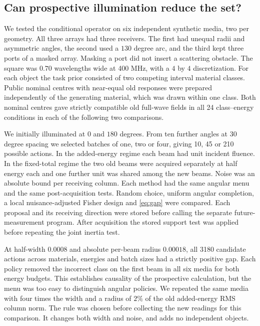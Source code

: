 \subsection{Can prospective illumination reduce the set?}
We tested the conditional operator on six independent synthetic media, two per geometry. All three arrays had three receivers. The first had unequal radii and asymmetric angles, the second used a $130$ degree arc, and the third kept three ports of a masked array. Masking a port did not insert a scattering obstacle. The square was $0.70$ wavelengths wide at 400 MHz, with a $4$ by $4$ discretization. For each object the task prior consisted of two competing interval material classes. Public nominal centres with near-equal old responses were prepared independently of the generating material, which was drawn within one class. Both nominal centres gave strictly compatible old full-wave fields in all 24 class--energy conditions in each of the following two comparisons.

We initially illuminated at $0$ and $180$ degrees. From ten further angles at $30$ degree spacing we selected batches of one, two or four, giving 10, 45 or 210 possible actions. In the added-energy regime each beam had unit incident fluence. In the fixed-total regime the two old beams were acquired separately at half energy each and one further unit was shared among the new beams. Noise was an absolute bound per receiving column. Each method had the same angular menu and the same post-acquisition tests. Random choice, uniform angular completion, a local nuisance-adjusted Fisher design and \eqref{eq:gap} were compared. Each proposal and its receiving direction were stored before calling the separate future-measurement program. After acquisition the stored support test was applied before repeating the joint inertia test.

At half-width $0.0008$ and absolute per-beam radius $0.00018$, all 3180 candidate actions across materials, energies and batch sizes had a strictly positive gap. Each policy removed the incorrect class on the first beam in all six media for both energy budgets. This establishes causality of the prospective calculation, but the menu was too easy to distinguish angular policies. We repeated the same media with four times the width and a radius of $2\%$ of the old added-energy RMS column norm. The rule was chosen before collecting the new readings for this comparison. It changes both width and noise, and adds no independent objects.

